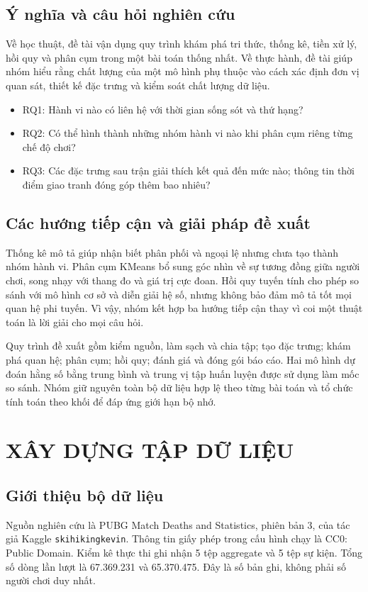 \documentclass[12pt,a4paper]{article}
\begin{document}
\subsection{Ý nghĩa và câu hỏi nghiên cứu}
Về học thuật, đề tài vận dụng quy trình khám phá tri thức, thống kê, tiền xử lý, hồi quy và phân cụm trong một bài toán thống nhất. Về thực hành, đề tài giúp nhóm hiểu rằng chất lượng của một mô hình phụ thuộc vào cách xác định đơn vị quan sát, thiết kế đặc trưng và kiểm soát chất lượng dữ liệu.
\begin{itemize}
\item RQ1: Hành vi nào có liên hệ với thời gian sống sót và thứ hạng?
\item RQ2: Có thể hình thành những nhóm hành vi nào khi phân cụm riêng từng chế độ chơi?
\item RQ3: Các đặc trưng sau trận giải thích kết quả đến mức nào; thông tin thời điểm giao tranh đóng góp thêm bao nhiêu?
\end{itemize}
\subsection{Các hướng tiếp cận và giải pháp đề xuất}
Thống kê mô tả giúp nhận biết phân phối và ngoại lệ nhưng chưa tạo thành nhóm hành vi. Phân cụm KMeans bổ sung góc nhìn về sự tương đồng giữa người chơi, song nhạy với thang đo và giá trị cực đoan. Hồi quy tuyến tính cho phép so sánh với mô hình cơ sở và diễn giải hệ số, nhưng không bảo đảm mô tả tốt mọi quan hệ phi tuyến. Vì vậy, nhóm kết hợp ba hướng tiếp cận thay vì coi một thuật toán là lời giải cho mọi câu hỏi.

Quy trình đề xuất gồm kiểm nguồn, làm sạch và chia tập; tạo đặc trưng; khám phá quan hệ; phân cụm; hồi quy; đánh giá và đóng gói báo cáo. Hai mô hình dự đoán hằng số bằng trung bình và trung vị tập huấn luyện được sử dụng làm mốc so sánh. Nhóm giữ nguyên toàn bộ dữ liệu hợp lệ theo từng bài toán và tổ chức tính toán theo khối để đáp ứng giới hạn bộ nhớ.
\clearpage
\section{XÂY DỰNG TẬP DỮ LIỆU}
\subsection{Giới thiệu bộ dữ liệu}
Nguồn nghiên cứu là PUBG Match Deaths and Statistics, phiên bản 3, của tác giả Kaggle \texttt{skihikingkevin}. Thông tin giấy phép trong cấu hình chạy là CC0: Public Domain. Kiểm kê thực thi ghi nhận 5 tệp aggregate và 5 tệp sự kiện. Tổng số dòng lần lượt là 67.369.231 và 65.370.475. Đây là số bản ghi, không phải số người chơi duy nhất.

\end{document}
